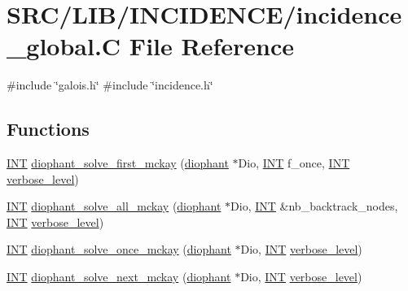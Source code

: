 \hypertarget{incidence__global_8_c}{}\section{S\+R\+C/\+L\+I\+B/\+I\+N\+C\+I\+D\+E\+N\+C\+E/incidence\+\_\+global.C File Reference}
\label{incidence__global_8_c}
{\ttfamily \#include \char`\"{}galois.\+h\char`\"{}}\newline
{\ttfamily \#include \char`\"{}incidence.\+h\char`\"{}}\newline
\subsection*{Functions}
\begin{DoxyCompactItemize}
\item 
\mbox{\hyperlink{galois_8h_a09fddde158a3a20bd2dcadb609de11dc}{I\+NT}} \mbox{\hyperlink{incidence__global_8_c_ac03e1a3fc0816caf0b6114281b46e142}{diophant\+\_\+solve\+\_\+first\+\_\+mckay}} (\mbox{\hyperlink{classdiophant}{diophant}} $\ast$Dio, \mbox{\hyperlink{galois_8h_a09fddde158a3a20bd2dcadb609de11dc}{I\+NT}} f\+\_\+once, \mbox{\hyperlink{galois_8h_a09fddde158a3a20bd2dcadb609de11dc}{I\+NT}} \mbox{\hyperlink{simeon_8_c_a818073fbcc2f439e7c56952f67386122}{verbose\+\_\+level}})
\item 
\mbox{\hyperlink{galois_8h_a09fddde158a3a20bd2dcadb609de11dc}{I\+NT}} \mbox{\hyperlink{incidence__global_8_c_ad4e4410d79cb10d555478dbf0036bd45}{diophant\+\_\+solve\+\_\+all\+\_\+mckay}} (\mbox{\hyperlink{classdiophant}{diophant}} $\ast$Dio, \mbox{\hyperlink{galois_8h_a09fddde158a3a20bd2dcadb609de11dc}{I\+NT}} \&nb\+\_\+backtrack\+\_\+nodes, \mbox{\hyperlink{galois_8h_a09fddde158a3a20bd2dcadb609de11dc}{I\+NT}} \mbox{\hyperlink{simeon_8_c_a818073fbcc2f439e7c56952f67386122}{verbose\+\_\+level}})
\item 
\mbox{\hyperlink{galois_8h_a09fddde158a3a20bd2dcadb609de11dc}{I\+NT}} \mbox{\hyperlink{incidence__global_8_c_a07850fda568ec16903a61d033baffd9d}{diophant\+\_\+solve\+\_\+once\+\_\+mckay}} (\mbox{\hyperlink{classdiophant}{diophant}} $\ast$Dio, \mbox{\hyperlink{galois_8h_a09fddde158a3a20bd2dcadb609de11dc}{I\+NT}} \mbox{\hyperlink{simeon_8_c_a818073fbcc2f439e7c56952f67386122}{verbose\+\_\+level}})
\item 
\mbox{\hyperlink{galois_8h_a09fddde158a3a20bd2dcadb609de11dc}{I\+NT}} \mbox{\hyperlink{incidence__global_8_c_aeaf43346f76cbfe64ca21d3e8d9ed8fe}{diophant\+\_\+solve\+\_\+next\+\_\+mckay}} (\mbox{\hyperlink{classdiophant}{diophant}} $\ast$Dio, \mbox{\hyperlink{galois_8h_a09fddde158a3a20bd2dcadb609de11dc}{I\+NT}} \mbox{\hyperlink{simeon_8_c_a818073fbcc2f439e7c56952f67386122}{verbose\+\_\+level}})

\end{DoxyCompactItemize}
